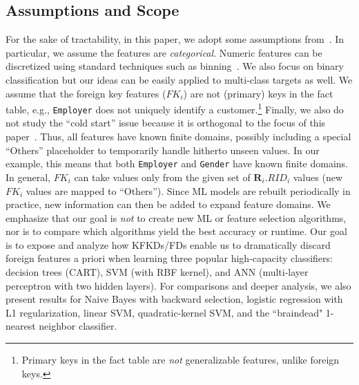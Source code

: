 \documentclass{vldb}
\begin{document}
\subsection{Assumptions and Scope}
For the sake of tractability, in this paper, we adopt some assumptions from~\cite{hamlet}. In particular, we assume the features are 
\textit{categorical}. Numeric features can be discretized using standard techniques such as binning~\cite{mitchellbook}. 
We also focus on binary classification but our ideas can be easily applied to multi-class targets as well. 
We assume that the foreign key features ($FK_i$) are not (primary) keys in the fact table, e.g., \texttt{Employer} does 
not uniquely identify a customer.\footnote{Primary keys in the fact table are \textit{not} generalizable features, unlike foreign keys.}
Finally, we also do not study the ``cold start'' issue because it is orthogonal to the focus of this paper~\cite{coldstart}. Thus, all features 
have known finite domains, possibly including a special ``Others'' placeholder to temporarily handle hitherto unseen values. 
In our example, this means that both \texttt{Employer} and \texttt{Gender} have known finite domains.
In general, $FK_i$ can take values only from the given set of $\textbf{R}_i.RID_i$ values (new $FK_i$ values 
are mapped to ``Others''). Since ML models are rebuilt periodically in practice, new information can then be added to expand feature domains. 
We emphasize that our goal is \textit{not} to create new ML or feature selection algorithms, nor is to compare which algorithms yield 
the best accuracy or runtime. Our goal is to expose and analyze how KFKDs/FDs enable us to dramatically discard foreign features a priori 
when learning three popular high-capacity classifiers: decision trees (CART), SVM (with RBF kernel), and ANN (multi-layer perceptron with 
two hidden layers). For comparisons and deeper analysis, we also present results for Naive Bayes with backward selection, logistic regression with
L1 regularization, linear SVM, quadratic-kernel SVM, and the ``braindead" 1-nearest neighbor classifier.
\end{document}
